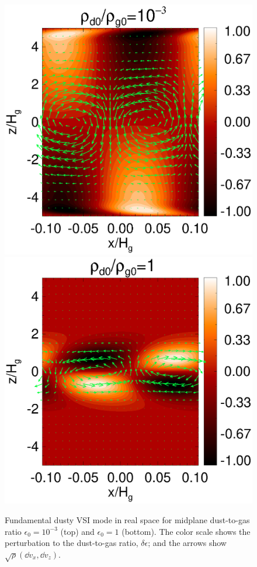 \begin{figure}
  \includegraphics[scale=0.54, clip=true, trim=0cm 2.5cm 0cm 0cm]{figures/result2d_dg1d-3.ps}\\
  \includegraphics[scale=0.54]{figures/result2d_dg1.ps} 
  \caption{Fundamental dusty VSI mode in real space for midplane dust-to-gas
    ratio $\epsilon_0=10^{-3}$ (top) and $\epsilon_0=1$
    (bottom). The color scale shows the perturbation to the
    dust-to-gas ratio, $\delta\epsilon$; and the arrows show
    $\sqrt{\rho}\left(\dd v_x, \dd v_z\right)$. 
    \label{vsi_dust_loading2d}
    }
\end{figure}


